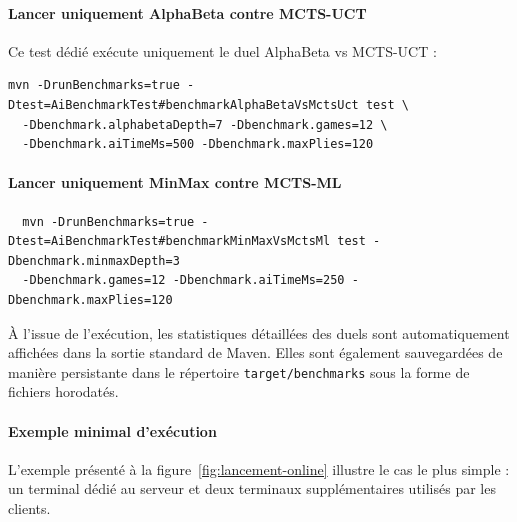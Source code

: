 \documentclass[a4paper]{article}
\begin{document}
\paragraph{Lancer uniquement AlphaBeta contre MCTS-UCT}
Ce test dédié exécute uniquement le duel AlphaBeta vs MCTS-UCT :
\begin{verbatim}
mvn -DrunBenchmarks=true -Dtest=AiBenchmarkTest#benchmarkAlphaBetaVsMctsUct test \
  -Dbenchmark.alphabetaDepth=7 -Dbenchmark.games=12 \
  -Dbenchmark.aiTimeMs=500 -Dbenchmark.maxPlies=120
\end{verbatim}

\paragraph{Lancer uniquement MinMax contre MCTS-ML}
\begin{verbatim}
  mvn -DrunBenchmarks=true -Dtest=AiBenchmarkTest#benchmarkMinMaxVsMctsMl test -Dbenchmark.minmaxDepth=3 
  -Dbenchmark.games=12 -Dbenchmark.aiTimeMs=250 -Dbenchmark.maxPlies=120
\end{verbatim}

À l'issue de l'exécution, les statistiques détaillées des duels sont automatiquement affichées dans la sortie standard de Maven.
 Elles sont également sauvegardées de manière persistante dans le répertoire \texttt{target/benchmarks} sous la forme de fichiers horodatés.


\paragraph{Exemple minimal d'exécution}
L'exemple présenté à la figure~\ref{fig:lancement-online} illustre le cas le
plus simple : un terminal dédié au serveur et deux terminaux supplémentaires
utilisés par les clients.
\end{document}

